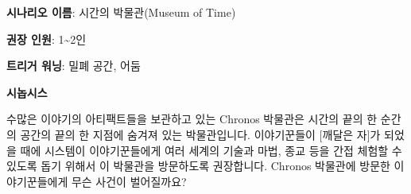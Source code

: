 \documentclass{report}
\begin{document}
	\textbf{시나리오 이름}: 시간의 박물관(Museum of Time)
	
	\textbf{권장 인원}: 1\textasciitilde2인
	
	\textbf{트리거 워닝}: 밀폐 공간, 어둠
	
	\textbf{시놉시스}
	
	수많은 이야기의 아티팩트들을 보관하고 있는 Chronos 박물관은 시간의 끝의 한 순간의 공간의 끝의 한 지점에 숨겨져 있는 박물관입니다. 이야기꾼들이 [깨달은 자]가 되었을 때에 시스템이 이야기꾼들에게 여러 세계의 기술과 마법, 종교 등을 간접 체험할 수 있도록 돕기 위해서 이 박물관을 방문하도록 권장합니다. Chronos 박물관에 방문한 이야기꾼들에게 무슨 사건이 벌어질까요?
\end{document}
